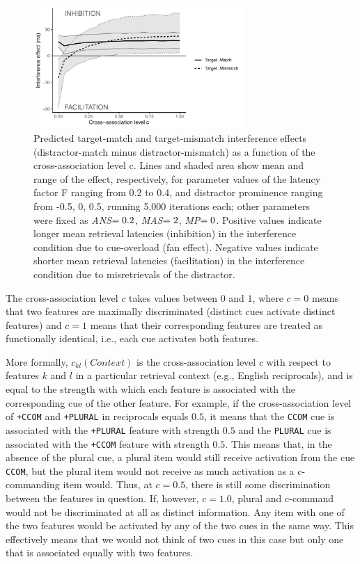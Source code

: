 \documentclass{cambridge7A}\usepackage[]{graphicx}\usepackage[]{color}
\newcommand{\actrcue}[1]{\texttt{\uppercase{#1}}}
\newcommand{\match}[1]{\texttt{+\uppercase{#1}}}
\begin{document}
\begin{figure}[!htbp]
\centering
\includegraphics[width=8cm]{figures/cueconfusion}

\caption{Predicted target-match and target-mismatch interference effects (distractor-match minus  distractor-mismatch) as a function of the cross-association level c. Lines and shaded area show mean and range of the effect, respectively, for parameter values of the latency factor F ranging from 0.2 to 0.4, and distractor prominence ranging from -0.5, 0, 0.5, running 5,000 iterations each; other parameters were fixed as \textit{ANS}$\protect =0.2$, \textit{MAS}$\protect =2$, \textit{MP}$\protect =0$. Positive values indicate longer mean retrieval latencies (inhibition) in the interference condition due to cue-overload (fan effect). Negative values indicate shorter mean retrieval latencies (facilitation) in the interference condition due to misretrievals of the distractor.}\label{fig:cueconf} 
\end{figure}

The cross-association level $c$ takes values between $0$ and $1$, where $c = 0$ means that two features are maximally discriminated (distinct cues activate distinct features) and $c = 1$ means that their corresponding features are treated as functionally identical, i.e., each cue activates both features.

More formally, $c_{kl}(Context)$ is the cross-association level $c$ with respect to features $k$ and $l$ in a particular retrieval context (e.g., English reciprocals), and is equal to the strength with which each feature is associated with the corresponding cue of the other feature. 
For example, if the cross-association level of \match{ccom} and \match{plural} in reciprocals equals $0.5$, it means that the \actrcue{ccom} cue is associated with the \match{plural} feature with strength $0.5$ and the \actrcue{plural} cue is associated with the \match{ccom} feature with strength $0.5$. 
This means that, in the absence of the plural cue, a plural item would still receive activation from the cue \actrcue{ccom}, but the plural item would not receive as much activation as a c-commanding item would.
Thus, at $c=0.5$, there is still some discrimination between the features in question. 
If, however, $c=1.0$, plural and c-command would not be discriminated at all as distinct information. Any item with one of the two features would be activated by any of the two cues in the same way. 
This effectively means that we would not think of two cues in this case but only one that is associated equally with two features.
\end{document}
